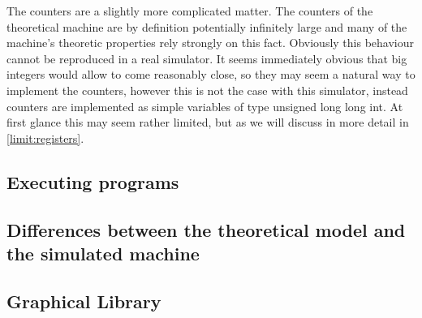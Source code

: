 The counters are a slightly more complicated matter. The counters of the theoretical machine are by definition potentially infinitely large and many of the machine's theoretic properties rely strongly on this fact. Obviously this behaviour cannot be reproduced in a real simulator. It seems immediately obvious that big integers would allow to come reasonably close, so they may seem a natural way to implement the counters, however this is not the case with this simulator, instead counters are implemented as simple variables of type unsigned long long int. At first glance this may seem rather limited, but as we will discuss in more detail in \autoref{limit:registers}.
\subsection{Executing programs}
 
\subsection{Differences between the theoretical model and the simulated machine}
\subsection{Graphical Library}
